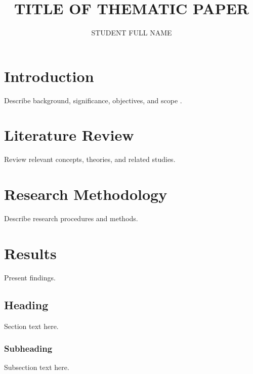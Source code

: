 \documentclass{muthesis2026}
\title{TITLE OF THEMATIC PAPER}
\author{STUDENT FULL NAME}
\begin{document}
\maketitle



\tableofcontents
\listoftables
\listoffigures


\chapter{Introduction}
Describe background, significance, objectives, and scope \cite{mount2004bioinformatics}.

\chapter{Literature Review}
Review relevant concepts, theories, and related studies.

\chapter{Research Methodology}
Describe research procedures and methods.

\chapter{Results}
Present findings.

\section{Heading}
Section text here.

\subsection{Subheading}
Subsection text here.
\end{document}

